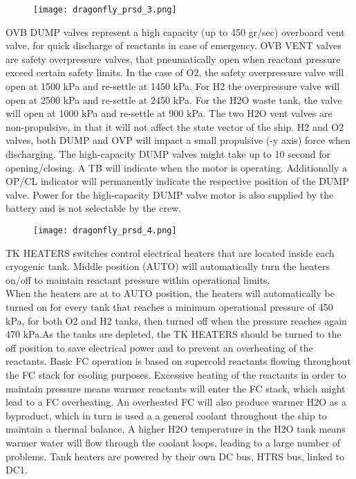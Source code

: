 \documentclass[Orbiter User Manual.tex]{subfiles}
\begin{document}
\begin{figure}[H]
  \centering
  \texttt{[image: dragonfly\_prsd\_3.png]}
\end{figure}

\noindent
OVB DUMP valves represent a high capacity (up to 450 gr/sec) overboard vent valve, for quick discharge of reactants in case of emergency. OVB VENT valves are safety overpressure valves, that pneumatically open when reactant pressure exceed certain safety limits. In the case of O2, the safety overpressure valve will open at 1500 kPa and re-settle at 1450 kPa. For H2 the overpressure valve will open at 2500 kPa and re-settle at 2450 kPa. For the H2O waste tank, the valve will open at 1000 kPa and re-settle at 900 kPa. The two H2O vent valves are non-propulsive, in that it will not affect the state vector of the ship. H2 and O2 valves, both DUMP and OVP will impact a small propulsive (-y axis) force when discharging. The high-capacity DUMP valves might take up to 10 second for opening/closing. A TB will indicate when the motor is operating. Additionally a OP/CL indicator will permanently indicate the respective position of the DUMP valve. Power for the high-capacity DUMP valve motor is also supplied by the battery and is not selectable by the crew.

\begin{figure}[H]
  \centering
  \texttt{[image: dragonfly\_prsd\_4.png]}
\end{figure}

\noindent
TK HEATERS switches control electrical heaters that are located inside each cryogenic tank. Middle position (AUTO) will automatically turn the heaters on/off to maintain reactant pressure within operational limits.\\
When the heaters are at to AUTO position, the heaters will automatically be turned on for every tank that reaches a minimum operational pressure of 450 kPa, for both O2 and H2 tanks, then turned off when the pressure reaches again 470 kPa.As the tanks are depleted, the TK HEATERS should be turned to the off position to save electrical power and to prevent an overheating of the reactants. Basic FC operation is based on supercold reactants flowing throughout the FC stack for cooling purposes. Excessive heating of the reactants in order to maintain pressure means warmer reactants will enter the FC stack, which might lead to a FC overheating. An overheated FC will also produce warmer H2O as a byproduct, which in turn is used a a general coolant throughout the ship to maintain a thermal balance. A higher H2O temperature in the H2O tank means warmer water will flow through the coolant loops, leading to a large number of problems. Tank heaters are powered by their own DC bus, HTRS bus, linked to DC1.
\end{document}
